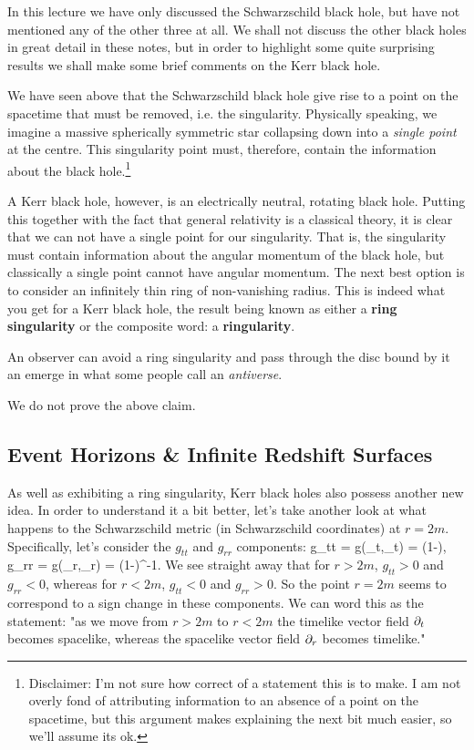 In this lecture we have only discussed the Schwarzschild black hole, but have not mentioned any of the other three at all. We shall not discuss the other black holes in great detail in these notes, but in order to highlight some quite surprising results we shall make some brief comments on the Kerr black hole. 
 
We have seen above that the Schwarzschild black hole give rise to a point on the spacetime that must be removed, i.e. the singularity. Physically speaking, we imagine a massive spherically symmetric star collapsing down into a \textit{single point} at the centre. This singularity point must, therefore, contain the information about the black hole.\footnote{Disclaimer: I'm not sure how correct of a statement this is to make. I am not overly fond of attributing information to an absence of a point on the spacetime, but this argument makes explaining the next bit much easier, so we'll assume its ok.}

A Kerr black hole, however, is an electrically neutral, rotating black hole. Putting this together with the fact that general relativity is a classical theory, it is clear that we can not have a single point for our singularity. That is, the singularity must contain information about the angular momentum of the black hole, but classically a single point cannot have angular momentum. The next best option is to consider an infinitely thin ring of non-vanishing radius. This is indeed what you get for a Kerr black hole, the result being known as either a \textbf{ring singularity} or the composite word: a \textbf{ringularity}.

\bcl 
    An observer can avoid a ring singularity and pass through the disc bound by it an emerge in what some people call an \textit{antiverse}.
\ecl

We do not prove the above claim.

\subsection{Event Horizons \& Infinite Redshift Surfaces}

As well as exhibiting a ring singularity, Kerr black holes also possess another new idea. In order to understand it a bit better, let's take another look at what happens to the Schwarzschild metric (in Schwarzschild coordinates) at $r=2m$. Specifically, let's consider the $g_{tt}$ and $g_{rr}$ components:
\bse 
    g_{tt} = g(\p_t,\p_t) = \bigg(1-\bigg), \qand g_{rr} = g(\p_r,\p_r) = \bigg(1-\bigg)^{-1}.
\ese 
We see straight away that for $r>2m$, $g_{tt}>0$ and $g_{rr}<0$, whereas for $r<2m$, $g_{tt}<0$ and $g_{rr}>0$. So the point $r=2m$ seems to correspond to a sign change in these components. We can word this as the statement: "as we move from $r>2m$ to $r<2m$ the timelike vector field $\partial_t$ becomes spacelike, whereas the spacelike vector field $\partial_r$ becomes timelike." 

